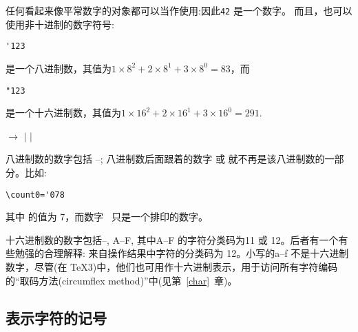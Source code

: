 \documentclass{book}
\begin{document}
任何看起来像平常数字的对象都可以当作使用:因此\verb-42- 是一个数字。
而且，也可以使用非十进制的数字符号:

\begin{verbatim}
'123
\end{verbatim}

是一个八进制数，其值为$1\times8^2+2\times8^1+3\times8^0=83$，而

\begin{verbatim}
"123
\end{verbatim}

是一个十六进制数，其值为$1\times16^2+2\times16^1+3\times16^0=291$.

\begin{disp} $\longrightarrow$
 \nl
\indent $|$ \nl
\indent $|$ 
\end{disp}

八进制数的数字包括 --; 
八进制数后面跟着的数字 或  就不再是该八进制数的一部分。比如:

\begin{verbatim}
\count0='078
\end{verbatim}
其中  的值为 7，而数字~ 只是一个排印的数字。


十六进制数的数字包括--, \n A--\n F, 其中\n A--\n F 的字符分类码为11  或 12。后者有一个有些勉强的合理解释:
来自操作结果中字符的分类码为 12。小写的\n a--\n f 不是十六进制数字，尽管(在 \TeX3)中，他们也可用作十六进制表示，用于访问所有字符编码的“取码方法(circumflex method)”中(见第~\ref{char}~章)。

\subsection{表示字符的记号}
\end{document}
